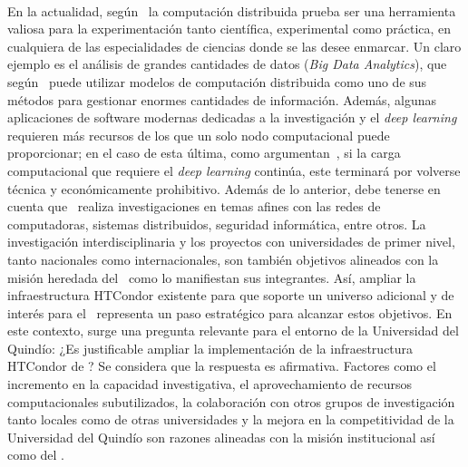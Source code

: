 \label{cap:justificacion}
\mbox{}\\

\noindent
En la actualidad, según~\cite{Bianchi2013} la computación distribuida prueba ser una herramienta valiosa para la experimentación tanto científica, experimental como práctica, en cualquiera de las especialidades de ciencias donde se las desee enmarcar. Un claro ejemplo es el análisis de grandes cantidades de datos (\textit{Big Data Analytics}), que según~\cite{Tsai2015} puede utilizar modelos de computación distribuida como uno de sus métodos para gestionar enormes cantidades de información. Además, algunas aplicaciones de software modernas dedicadas a la investigación y el \textit{deep learning} requieren más recursos de los que un solo nodo computacional puede proporcionar; en el caso de esta última, como argumentan~\cite{Thomson2023}, si la carga computacional que requiere el \textit{deep learning} continúa, este terminará por volverse técnica y económicamente prohibitivo.
Además de lo anterior, debe tenerse en cuenta que \GRID~realiza investigaciones en temas afines con las redes de computadoras, sistemas distribuidos, seguridad informática, entre otros. La investigación interdisciplinaria y los proyectos con universidades de primer nivel, tanto nacionales como internacionales, son también objetivos alineados con la misión heredada del \GRID~como lo manifiestan sus integrantes. Así, ampliar la infraestructura HTCondor existente para que soporte un universo adicional y de interés para el \GRID~representa un paso estratégico para alcanzar estos objetivos.
En este contexto, surge una pregunta relevante para el entorno de la Universidad del Quindío: ¿Es justificable ampliar la implementación de la infraestructura HTCondor de \GRID? Se considera que la respuesta es afirmativa. Factores como el incremento en la capacidad investigativa, el aprovechamiento de recursos computacionales subutilizados, la colaboración con otros grupos de investigación tanto locales como de otras universidades y la mejora en la competitividad de la Universidad del Quindío son razones alineadas con la misión institucional así como del \GRID.
